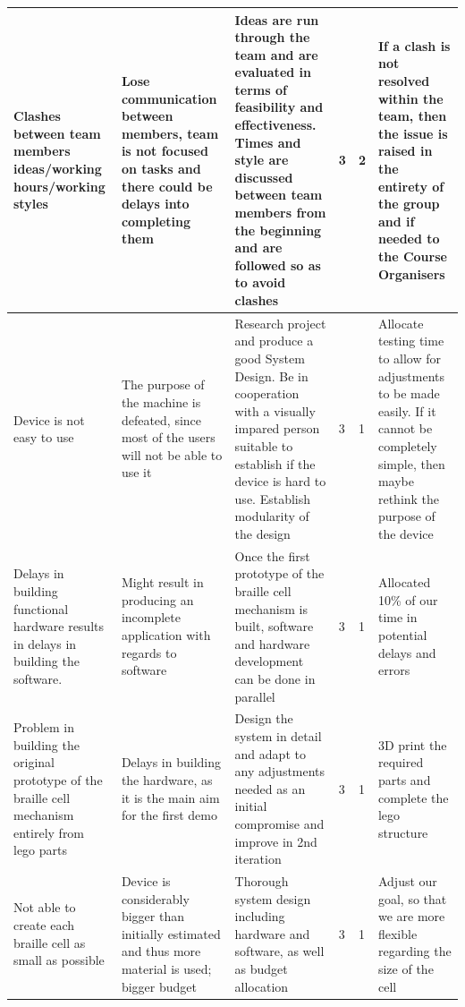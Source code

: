 \documentclass{article}
\begin{document}
\begin{table}[h]
\begin{center}
\begin{small}
\begin{tabular}{|p{3cm}|p{3cm}|p{3cm}|p{0.5cm}|p{0.5cm}|p{3cm}|}
Clashes between team members ideas/working hours/working styles                                   & Lose communication between members, team is not focused on tasks and there could be delays into completing them & Ideas are run through the team and are evaluated in terms of feasibility and effectiveness. Times and style are discussed between team members from the beginning and are followed so as to avoid clashes & 3        & 2          & If a clash is not resolved within the team, then the issue is raised in the entirety of the group and if needed to the Course Organisers          \\ \hline
Device is not easy to use                                                                         & The purpose of the machine is defeated, since most of the users will not be able to use it                      & Research project and produce a good System Design. Be in cooperation with a visually impared person suitable to establish if the device is hard to use. Establish modularity of the design                & 3        & 1          & Allocate testing time to allow for adjustments to be made easily. If it cannot be completely simple, then maybe rethink the purpose of the device \\ \hline
Delays in building functional hardware results in delays in building the software.                & Might result in producing an incomplete application with regards to software                                    & Once the first prototype of the braille cell mechanism is built, software and hardware development can be done in parallel                                                                                & 3        & 1          & Allocated 10\% of our time in potential delays and errors                                                                                         \\ \hline
Problem in building the original prototype of the braille cell mechanism entirely from lego parts & Delays in building the hardware, as it is the main aim for the first demo                                       & Design the system in detail and adapt to any adjustments needed as an initial compromise and improve in 2nd iteration                                                                                     & 3        & 1          & 3D print the required parts and complete the lego structure                                                                                       \\ \hline
Not able to create each braille cell as small as possible                                         & Device is considerably bigger than initially estimated and thus more material is used; bigger budget            & Thorough system design including hardware and software, as well as budget allocation                                                                                                                      & 3        & 1          & Adjust our goal, so that we are more flexible regarding the size of the cell                                                                      \\ \hline

\end{tabular}
\end{small}
\end{center}
\end{table}
\end{document}
